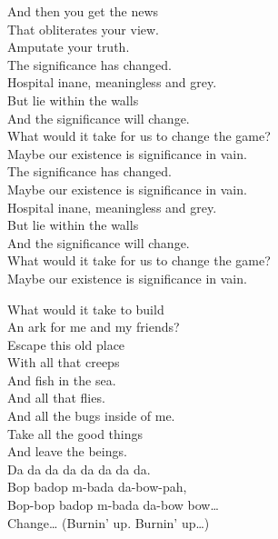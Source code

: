 And then you get the news \\
That obliterates your view. \\
Amputate your truth. \\
The significance has changed. \\

Hospital inane, meaningless and grey. \\
But lie within the walls \\
And the significance will change. \\
What would it take for us to change the game? \\
Maybe our existence is significance in vain. \\

The significance has changed. \\
Maybe our existence is significance in vain. \\

Hospital inane, meaningless and grey. \\
But lie within the walls \\
And the significance will change. \\
What would it take for us to change the game? \\
Maybe our existence is significance in vain. \\


What would it take to build \\
An ark for me and my friends? \\
Escape this old place \\
With all that creeps \\
And fish in the sea. \\
And all that flies. \\
And all the bugs inside of me. \\
Take all the good things \\
And leave the  beings. \\

Da da da da da da da da. \\
Bop badop m-bada da-bow-pah, \\
Bop-bop badop m-bada da-bow bow… \\

Change… (Burnin' up. Burnin' up…) \\


